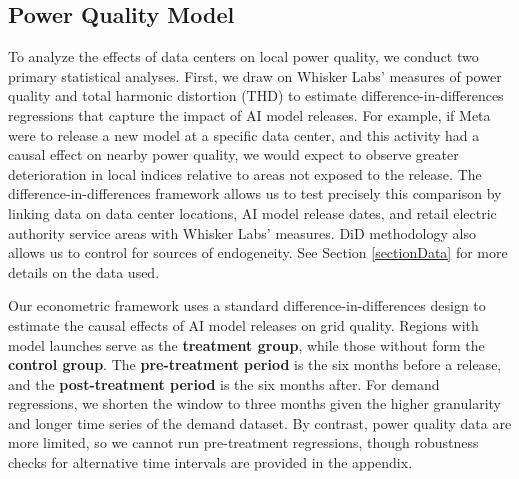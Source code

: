 \documentclass[sigconf,authordraft]{acmart}
\begin{document}
\subsection{Power Quality Model}
To analyze the effects of data centers on local power quality, we conduct two primary statistical analyses. First, we draw on Whisker Labs’ measures of power quality and total harmonic distortion (THD) to estimate difference-in-differences regressions that capture the impact of AI model releases. For example, if Meta were to release a new model at a specific data center, and this activity had a causal effect on nearby power quality, we would expect to observe greater deterioration in local indices relative to areas not exposed to the release. The difference-in-differences framework allows us to test precisely this comparison by linking data on data center locations, AI model release dates, and retail electric authority service areas with Whisker Labs’ measures. DiD methodology also allows us to control for sources of endogeneity. See Section \ref{sectionData} for more details on the data used.

Our econometric framework uses a standard difference-in-differences design to estimate the causal effects of AI model releases on grid quality. Regions with model launches serve as the \textbf{treatment group}, while those without form the \textbf{control group}. The \textbf{pre-treatment period} is the six months before a release, and the \textbf{post-treatment period} is the six months after. For demand regressions, we shorten the window to three months given the higher granularity and longer time series of the demand dataset. By contrast, power quality data are more limited, so we cannot run pre-treatment regressions, though robustness checks for alternative time intervals are provided in the appendix.
\end{document}
